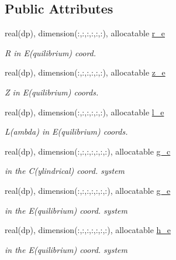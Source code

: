 \subsection*{Public Attributes}
\begin{DoxyCompactItemize}
\item 
real(dp), dimension(\+:,\+:,\+:,\+:,\+:,\+:), allocatable \hyperlink{structeq__vars_1_1eq__2__type_a88db622db05819a2a3a9ceae7ca7d424}{r\+\_\+e}
\begin{DoxyCompactList}\small\item\em R in E(quilibrium) coord. \end{DoxyCompactList}\item 
real(dp), dimension(\+:,\+:,\+:,\+:,\+:,\+:), allocatable \hyperlink{structeq__vars_1_1eq__2__type_aad08fbb13ba950f7d74a55bc3ffad635}{z\+\_\+e}
\begin{DoxyCompactList}\small\item\em Z in E(quilibrium) coords. \end{DoxyCompactList}\item 
real(dp), dimension(\+:,\+:,\+:,\+:,\+:,\+:), allocatable \hyperlink{structeq__vars_1_1eq__2__type_a88d3632a03817186dd805aa4f194b26b}{l\+\_\+e}
\begin{DoxyCompactList}\small\item\em L(ambda) in E(quilibrium) coords. \end{DoxyCompactList}\item 
real(dp), dimension(\+:,\+:,\+:,\+:,\+:,\+:,\+:), allocatable \hyperlink{structeq__vars_1_1eq__2__type_a802c4087efeb67ea5fb5d837267af4b1}{g\+\_\+c}
\begin{DoxyCompactList}\small\item\em in the C(ylindrical) coord. system \end{DoxyCompactList}\item 
real(dp), dimension(\+:,\+:,\+:,\+:,\+:,\+:,\+:), allocatable \hyperlink{structeq__vars_1_1eq__2__type_a19309c67f2334ff898d3eef1a9b1b1da}{g\+\_\+e}
\begin{DoxyCompactList}\small\item\em in the E(quilibrium) coord. system \end{DoxyCompactList}\item 
real(dp), dimension(\+:,\+:,\+:,\+:,\+:,\+:,\+:), allocatable \hyperlink{structeq__vars_1_1eq__2__type_a15446fe9e969815238268794425f6e8c}{h\+\_\+e}
\begin{DoxyCompactList}\small\item\em in the E(quilibrium) coord. system \end{DoxyCompactList}\item 

\end{DoxyCompactItemize}
